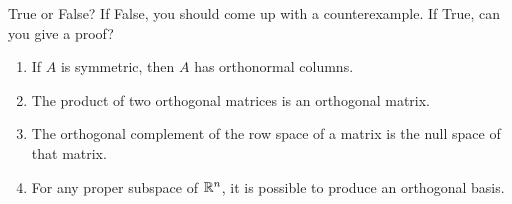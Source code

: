 \documentclass{ximera}
\author{}
\begin{document}
\begin{exercise}

True or False?  If False, you should come up with a counterexample.  If True, can you give a proof?

 \begin{enumerate}
     \item If $A$ is symmetric, then $A$ has orthonormal columns.

 \begin{multipleChoice}
 \end{multipleChoice}

 \item The product of two orthogonal matrices is an orthogonal matrix.

 \begin{multipleChoice}
 \end{multipleChoice}

 \item The orthogonal complement of the row space of a matrix is the null space of that matrix.

 \begin{multipleChoice}
 \end{multipleChoice}

 \item For any proper subspace of $\mathbb{R}^n$, it is possible to produce an orthogonal basis.

 \begin{multipleChoice}
 \end{multipleChoice}


 \end{enumerate}

 
\end{exercise}
\end{document}
